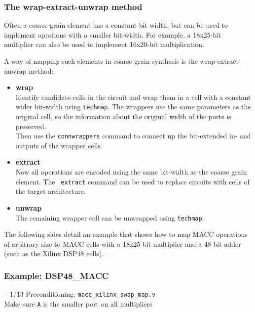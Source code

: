 \subsubsection{The wrap-extract-unwrap method}

\begin{frame}{\subsubsecname}
\scriptsize
Often a coarse-grain element has a constant bit-width, but can be used to
implement oprations with a smaller bit-width. For example, a 18x25-bit multiplier
can also be used to implement 16x20-bit multiplication.

\bigskip
A way of mapping such elements in coarse grain synthesis is the wrap-extract-unwrap method:

\begin{itemize}
\item {\bf wrap} \\
Identify candidate-cells in the circuit and wrap them in a cell with a constant
wider bit-width using {\tt techmap}. The wrappers use the same parameters as the original cell, so
the information about the original width of the ports is preserved. \\
Then use the {\tt connwrappers} command to connect up the bit-extended in- and
outputs of the wrapper cells.
\item {\bf extract} \\
Now all operations are encoded using the same bit-width as the coarse grain element. The {\tt
extract} command can be used to replace circuits with cells of the target architecture.
\item {\bf unwrap} \\
The remaining wrapper cell can be unwrapped using {\tt techmap}.
\end{itemize}

\bigskip
The following sides detail an example that shows how to map MACC operations of
arbitrary size to MACC cells with a 18x25-bit multiplier and a 48-bit adder (such as
the Xilinx DSP48 cells).
\end{frame}

\subsubsection{Example: DSP48\_MACC}

\begin{frame}[t, fragile]{\subsubsecname{} -- 1/13}
Preconditioning: {\tt macc\_xilinx\_swap\_map.v} \\
Make sure {\tt A} is the smaller port on all multipliers

\begin{columns}
\column{5cm}

\column{5cm}

\end{columns}
\end{frame}

